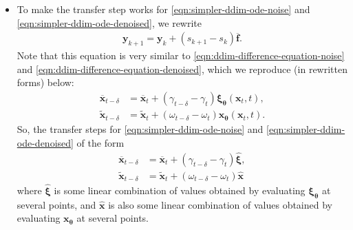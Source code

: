 \documentclass[10pt]{article}
\newcommand{\ve}[1]{\mathbf{#1}}
\newcommand{\ves}[1]{\boldsymbol{#1}}
\newcommand{\ov}[1]{\overline{#1}}
\begin{document}
\begin{itemize}
  \item To make the transfer step works for \eqref{eqn:simpler-ddim-ode-noise} and \eqref{eqn:simpler-ddim-ode-denoised}, we rewrite 
  \begin{align*}
    \ve{y}_{k+1} = \ve{y}_k + (s_{k+1} - s_k) \ov{\ve{f}}.
  \end{align*}
  Note that this equation is very similar to \eqref{eqn:ddim-difference-equation-noise} and \eqref{eqn:ddim-difference-equation-denoised}, which we reproduce (in rewritten forms) below:
  \begin{align*}
    \ov{\ve{x}}_{t-\delta} &= \ov{\ve{x}}_{t} + (\gamma_{t - \delta} - \gamma_{t}) \ves{\xi}_{\ves{\theta}}(\ve{x}_t, t), \\
    \widetilde{\ve{x}}_{t-\delta} &= \widetilde{\ve{x}}_{t} + (\omega_{t - \delta} - \omega_{t}) \ve{x}_{\ves{\theta}}(\ve{x}_t, t).
  \end{align*}
  So, the transfer steps for \eqref{eqn:simpler-ddim-ode-noise} and \eqref{eqn:simpler-ddim-ode-denoised} of the form
  \begin{align*}
    \ov{\ve{x}}_{t-\delta} &= \ov{\ve{x}}_{t} + (\gamma_{t - \delta} - \gamma_{t}) \widehat{\ves{\xi}}, \\
    \widetilde{\ve{x}}_{t-\delta} &= \widetilde{\ve{x}}_{t} + (\omega_{t - \delta} - \omega_{t}) \widehat{\ves{x}}
  \end{align*}
  where $\widehat{\ves{\xi}}$ is some linear combination of values obtained by evaluating $\ves{\xi}_{\ves{\theta}}$ at several points, and $\widehat{\ves{x}}$ is also some linear combination of values obtained by evaluating $\ve{x}_{\ves{\theta}}$ at several points.


\end{itemize}
\end{document}
